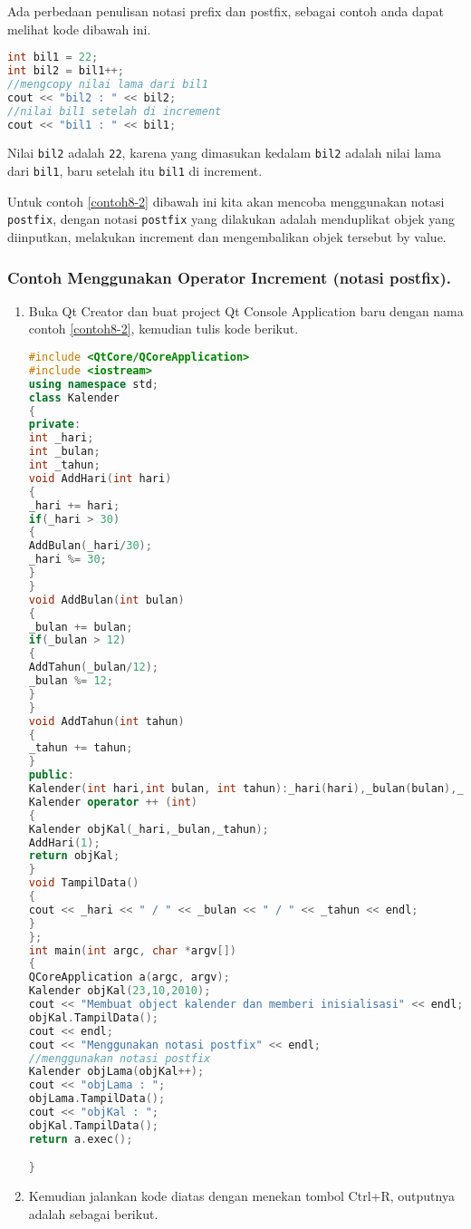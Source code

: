 Ada perbedaan penulisan notasi prefix dan postfix, sebagai contoh anda
dapat melihat kode dibawah ini.

\begin{lstlisting}[language=c++, numbers=none]
int bil1 = 22;
int bil2 = bil1++;
//mengcopy nilai lama dari bil1
cout << "bil2 : " << bil2;
//nilai bil1 setelah di increment
cout << "bil1 : " << bil1;
\end{lstlisting}

Nilai \texttt{bil2} adalah \texttt{22}, karena yang dimasukan kedalam
\texttt{bil2} adalah nilai lama dari \texttt{bil1}, baru setelah itu
\texttt{bil1} di increment.

Untuk contoh \ref{contoh8-2} dibawah ini kita akan mencoba menggunakan notasi
\texttt{postfix}, dengan notasi \texttt{postfix} yang dilakukan adalah
menduplikat objek yang diinputkan, melakukan increment dan mengembalikan
objek tersebut by value.

\subsubsection*{Contoh  Menggunakan Operator Increment (notasi postfix).}

\begin{enumerate}

\item
  Buka Qt Creator dan buat project Qt Console Application baru dengan
  nama contoh \ref{contoh8-2}, kemudian tulis kode berikut.

\begin{lstlisting}[language=c++, caption=Menggunakan Operator Increment (notasi postfix), label=contoh8-2]
#include <QtCore/QCoreApplication>
#include <iostream>
using namespace std;
class Kalender
{
private:
int _hari;
int _bulan;
int _tahun;
void AddHari(int hari)
{
_hari += hari;
if(_hari > 30)
{
AddBulan(_hari/30);
_hari %= 30;
}
}
void AddBulan(int bulan)
{
_bulan += bulan;
if(_bulan > 12)
{
AddTahun(_bulan/12);
_bulan %= 12;
}
}
void AddTahun(int tahun)
{
_tahun += tahun;
}
public:
Kalender(int hari,int bulan, int tahun):_hari(hari),_bulan(bulan),_tahun(tahun){ }
Kalender operator ++ (int)
{
Kalender objKal(_hari,_bulan,_tahun);
AddHari(1);
return objKal;
}
void TampilData()
{
cout << _hari << " / " << _bulan << " / " << _tahun << endl;
}
};
int main(int argc, char *argv[])
{
QCoreApplication a(argc, argv);
Kalender objKal(23,10,2010);
cout << "Membuat object kalender dan memberi inisialisasi" << endl;
objKal.TampilData();
cout << endl;
cout << "Menggunakan notasi postfix" << endl;
//menggunakan notasi postfix
Kalender objLama(objKal++);
cout << "objLama : ";
objLama.TampilData();
cout << "objKal : ";
objKal.TampilData();
return a.exec();

}
\end{lstlisting}
\item
  Kemudian jalankan kode diatas dengan menekan tombol Ctrl+R, outputnya
  adalah sebagai berikut.
\end{enumerate}

